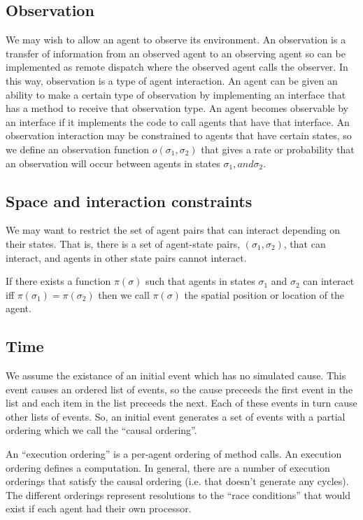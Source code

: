 \documentclass[a4paper]{article}
\begin{document}
\subsection{Observation}

We may wish to allow an agent to observe its environment. An observation is a transfer of information from an observed agent to an observing agent so can be implemented as remote dispatch where the observed agent calls the observer. In this way, observation is a type of agent interaction. An agent can be given an ability to make a certain type of observation by implementing an interface that has a method to receive that observation type. An agent becomes observable by an interface if it implements the code to call agents that have that interface. An observation interaction may be constrained to agents that have certain states, so we define an observation function $o(\sigma_1, \sigma_2)$ that gives a rate or probability that an observation will occur between agents in states $\sigma_1, and \sigma_2$.

\subsection{Space and interaction constraints}

We may want to restrict the set of agent pairs that can interact depending on their states. That is, there is a set of agent-state pairs, $(\sigma_1, \sigma_2)$, that can interact, and agents in other state pairs cannot interact.

If there exists a function $\pi(\sigma)$ such that agents in states $\sigma_1$ and $\sigma_2$ can interact iff $\pi(\sigma_1) = \pi(\sigma_2)$ then we call $\pi(\sigma)$ the spatial position or location of the agent.

\subsection{Time}

We assume the existance of an initial event which has no simulated cause. This event causes an ordered list of events, so the cause preceeds the first event in the list and each item in the list preceeds the next. Each of these events in turn cause other lists of events. So, an initial event generates a set of events with a partial ordering which we call the ``causal ordering''.

An ``execution ordering'' is a per-agent ordering of method calls. An execution ordering defines a computation. In general, there are a number of execution orderings that satisfy the causal ordering (i.e. that doesn't generate any cycles). The different orderings represent resolutions to the ``race conditions'' that would exist if each agent had their own processor.
\end{document}
